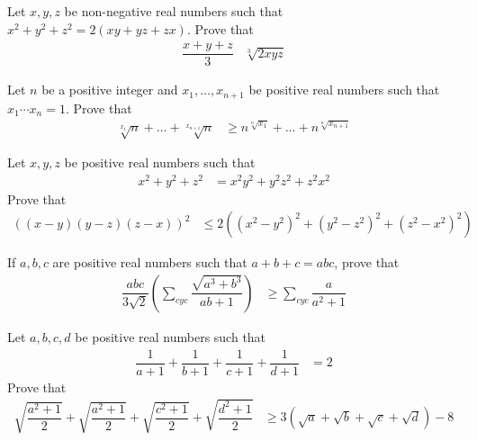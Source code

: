 \documentclass[inequalities.tex]{subfile}
\begin{document}
		\begin{problem}
			Let $x,y,z$ be non-negative real numbers such that $x^{2}+y^{2}+z^{2}=2(xy+yz+zx)$. Prove that
				\begin{align*}
					\dfrac{x+y+z}{3}
						& \sqrt[3]{2xyz}
				\end{align*}
		\end{problem}
	
		\begin{problem}
			Let $n$ be a positive integer and $x_{1},\ldots,x_{n+1}$ be positive real numbers such that $x_{1}\cdots x_{n}=1$. Prove that
				\begin{align*}
					\sqrt[x_{1}]{n}+\ldots+\sqrt[x_{n+1}]{n}
						& \geq n^{\sqrt[n]{x_{1}}}+\ldots+n^{\sqrt[n]{x_{n+1}}}
				\end{align*}
		\end{problem}
	
		\begin{problem}
			Let $x,y,z$ be positive real numbers such that
				\begin{align*}
					x^{2}+y^{2}+z^{2}
						& = x^{2}y^{2}+y^{2}z^{2}+z^{2}x^{2}
				\end{align*}
			Prove that
				\begin{align*}
					\left((x-y)(y-z)(z-x)\right)^{2}
						& \leq 2\left((x^{2}-y^{2})^{2}+(y^{2}-z^{2})^{2}+(z^{2}-x^{2})^{2}\right)
				\end{align*}
		\end{problem}
	
		\begin{problem}
			If $a,b,c$ are positive real numbers such that $a+b+c=abc$, prove that
				\begin{align*}
					\dfrac{abc}{3\sqrt{2}}\left(\sum_{cyc}\dfrac{\sqrt{a^{3}+b^{3}}}{ab+1}\right)
						& \geq \sum_{cyc}\dfrac{a}{a^{2}+1}
				\end{align*}
		\end{problem}
	
		\begin{problem}
			Let $a,b,c,d$ be positive real numbers such that
				\begin{align*}
					\dfrac{1}{a+1}+\dfrac{1}{b+1}+\dfrac{1}{c+1}+\dfrac{1}{d+1}
						& = 2
				\end{align*}
			Prove that
				\begin{align*}
					\sqrt{\dfrac{a^{2}+1}{2}}+\sqrt{\dfrac{a^{2}+1}{2}}+\sqrt{\dfrac{c^{2}+1}{2}}+\sqrt{\dfrac{d^{2}+1}{2}}
						& \geq 3(\sqrt{a}+\sqrt{b}+\sqrt{c}+\sqrt{d})-8
				\end{align*}
		\end{problem}
	
\end{document}
